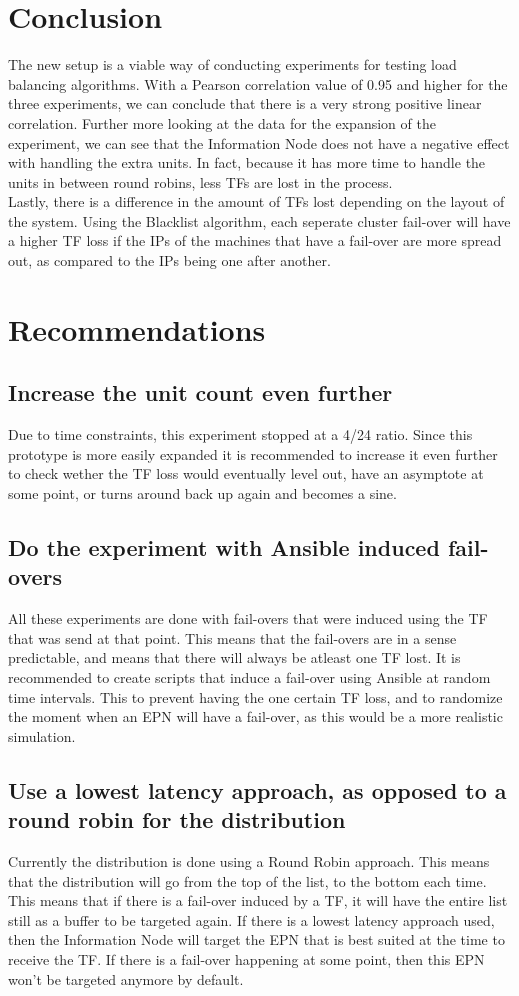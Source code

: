 \section{Conclusion}
The new setup is a viable way of conducting experiments for testing load balancing algorithms. With a Pearson correlation value of 0.95 and higher for the three experiments, we can conclude that there is a very strong positive linear correlation. Further more looking at the data for the expansion of the experiment, we can see that the Information Node does not have a negative effect with handling the extra units. In fact, because it has more time to handle the units in between round robins, less TFs are lost in the process. \\
Lastly, there is a difference in the amount of TFs lost depending on the layout of the system. Using the Blacklist algorithm, each seperate cluster fail-over will have a higher TF loss if the IPs of the machines that have a fail-over are more spread out, as compared to the IPs being one after another. 

\section{Recommendations}
\subsection{Increase the unit count even further}
Due to time constraints, this experiment stopped at a 4/24 ratio. Since this prototype is more easily expanded it is recommended to increase it even further to check wether the TF loss would eventually level out, have an asymptote at some point, or turns around back up again and becomes a sine.
\subsection{Do the experiment with Ansible induced fail-overs}
All these experiments are done with fail-overs that were induced using the TF that was send at that point. This means that the fail-overs are in a sense predictable, and means that there will always be atleast one TF lost. It is recommended to create scripts that induce a fail-over using Ansible at random time intervals. This to prevent having the one certain TF loss, and to randomize the moment when an EPN will have a fail-over, as this would be a more realistic simulation.
\subsection{Use a lowest latency approach, as opposed to a round robin for the distribution}
Currently the distribution is done using a Round Robin approach. This means that the distribution will go from the top of the list, to the bottom each time. This means that if there is a fail-over induced by a TF, it will have the entire list still as a buffer to be targeted again. If there is a lowest latency approach used, then the Information Node will target the EPN that is best suited at the time to receive the TF. If there is a fail-over happening at some point, then this EPN won't be targeted anymore by default.